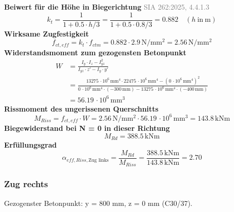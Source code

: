 \documentclass[11pt,a4paper]{article}
\newcommand{\normref}[1]{{\small\textcolor{gray}{#1}}}
\begin{document}
\noindent\textbf{Beiwert für die Höhe in Biegerichtung} \hfill \normref{SIA 262:2025, 4.4.1.3}
\begin{equation*}
k_t = \frac{1}{1 + 0.5 \cdot h/3} = \frac{1}{1 + 0.5 \cdot 0.8/3} = 0.882 \quad \left(h\ \text{in}\ \mathrm{m}\right)
\end{equation*}
\noindent\textbf{Wirksame Zugfestigkeit}
\begin{equation*}
f_{ct,eff} = k_t \cdot f_{ctm} = 0.882 \cdot 2.9\,\mathrm{N}/\mathrm{mm}^{2} = 2.56\,\mathrm{N}/\mathrm{mm}^{2}
\end{equation*}
\noindent\textbf{Widerstandsmoment zum gezogensten Betonpunkt}
\begin{equation*}
\begin{aligned}
  W &= \frac{I_y \cdot I_z - I_{yz}^{2}}{I_{yz} \cdot z' - I_y \cdot y'} \\
  &= \frac{13275\,\cdot 10^{6}\,\mathrm{mm}^{4} \cdot 22475\,\cdot 10^{6}\,\mathrm{mm}^{4} - \left(0\,\cdot 10^{6}\,\mathrm{mm}^{4}\right)^{2}}{0\,\cdot 10^{6}\,\mathrm{mm}^{4} \cdot \left(-300\,\mathrm{mm}\right) - 13275\,\cdot 10^{6}\,\mathrm{mm}^{4} \cdot \left(-400\,\mathrm{mm}\right)} \\
  &= 56.19\,\cdot 10^{6}\,\mathrm{mm}^{3}
\end{aligned}
\end{equation*}
\noindent\textbf{Rissmoment des ungerissenen Querschnitts}
\begin{equation*}
M_{Riss} = f_{ct,eff} \cdot W = 2.56\,\mathrm{N}/\mathrm{mm}^{2} \cdot 56.19\,\cdot 10^{6}\,\mathrm{mm}^{3} = 143.8\,\mathrm{kNm}
\end{equation*}
\noindent\textbf{Biegewiderstand bei N = 0 in dieser Richtung}
\begin{equation*}
M_{Rd} = 388.5\,\mathrm{kNm}
\end{equation*}
\noindent\textbf{Erfüllungsgrad}
\begin{equation*}
\alpha_{eff,Riss,\text{Zug links}} = \frac{M_{Rd}}{M_{Riss}} = \frac{388.5\,\mathrm{kNm}}{143.8\,\mathrm{kNm}} = 2.70
\end{equation*}
\subsubsection{Zug rechts}
Gezogenster Betonpunkt: y = 800 mm, z = 0 mm (C30/37).
\end{document}
